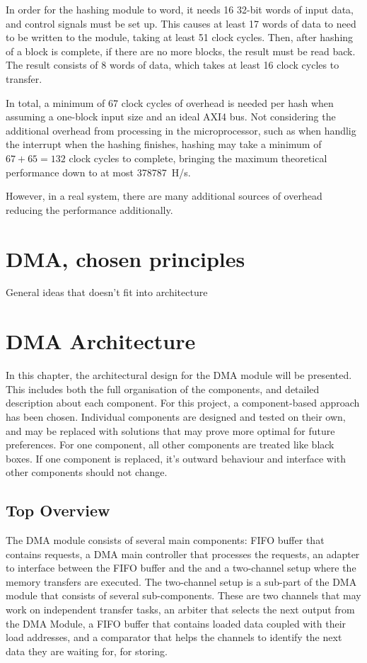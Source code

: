 In order for the hashing module to word, it needs 16 32-bit words of input data,
and control signals must be set up. This causes at least 17 words of data to
need to be written to the module, taking at least 51 clock cycles. Then, after
hashing of a block is complete, if there are no more blocks, the result must
be read back. The result consists of 8 words of data, which takes at least 16
clock cycles to transfer.

In total, a minimum of 67 clock cycles of overhead is needed per hash when assuming
a one-block input size and an ideal AXI4 bus. Not considering the additional overhead
from processing in the microprocessor, such as when handlig the interrupt when the
hashing finishes, hashing may take a minimum of $67 + 65 = 132$ clock cycles to
complete, bringing the maximum theoretical performance down to at most 378787~H/s.

However, in a real system, there are many additional sources of overhead reducing
the performance additionally.

\section{DMA, chosen principles}
General ideas that doesn't fit into architecture


\section{DMA Architecture}
In this chapter, the architectural design for the DMA module will be presented.
This includes both the full organisation of the components, and detailed description about each component. 
For this project, a component-based approach has been chosen.
Individual components are designed and tested on their own, and may be replaced with solutions that may prove more optimal for future preferences.
For one component, all other components are treated like black boxes.
If one component is replaced, it's outward behaviour and interface with other components should not change.

\subsection{Top Overview}
The DMA module consists of several main components: FIFO buffer that contains requests, a DMA main controller that processes the requests, an adapter to interface between the FIFO buffer and the and a two-channel setup where the memory transfers are executed. 
The two-channel setup is a sub-part of the DMA module that consists of several sub-components.
These are two channels that may work on independent transfer tasks, an arbiter that selects the next output from the DMA Module, a FIFO buffer that contains loaded data coupled with their load addresses, and a comparator that helps the channels to identify the next data they are waiting for, for storing.

